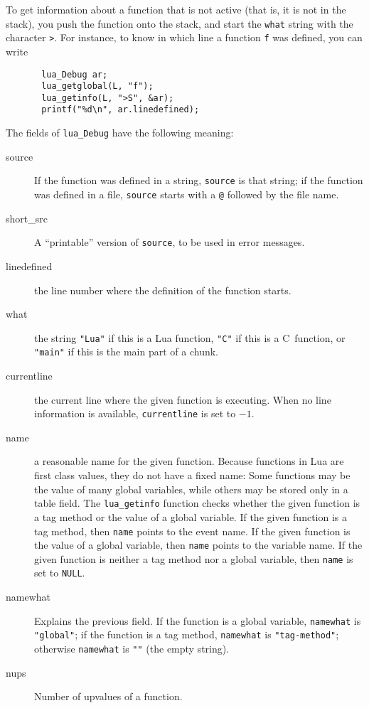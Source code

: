 \documentclass[11pt]{article}
\newcommand{\Math}[1]{$#1$}
\begin{document}
To get information about a function that is not active (that is,
it is not in the stack),
you push the function onto the stack,
and start the \verb|what| string with the character \verb|>|.
For instance, to know in which line a function \verb|f| was defined,
you can write
\begin{verbatim}
       lua_Debug ar;
       lua_getglobal(L, "f");
       lua_getinfo(L, ">S", &ar);
       printf("%d\n", ar.linedefined);
\end{verbatim}
The fields of \verb|lua_Debug| have the following meaning:
\begin{description}

\item[source]
If the function was defined in a string,
\verb|source| is that string;
if the function was defined in a file,
\verb|source| starts with a \verb|@| followed by the file name.

\item[short\_src]
A ``printable'' version of \verb|source|, to be used in error messages.

\item[linedefined]
the line number where the definition of the function starts.

\item[what] the string \verb|"Lua"| if this is a Lua function,
\verb|"C"| if this is a C~function,
or \verb|"main"| if this is the main part of a chunk.

\item[currentline]
the current line where the given function is executing.
When no line information is available,
\verb|currentline| is set to \Math{-1}.

\item[name]
a reasonable name for the given function.
Because functions in Lua are first class values,
they do not have a fixed name:
Some functions may be the value of many global variables,
while others may be stored only in a table field.
The \verb|lua_getinfo| function checks whether the given
function is a tag method or the value of a global variable.
If the given function is a tag method,
then \verb|name| points to the event name.
If the given function is the value of a global variable,
then \verb|name| points to the variable name.
If the given function is neither a tag method nor a global variable,
then \verb|name| is set to \verb|NULL|.

\item[namewhat]
Explains the previous field.
If the function is a global variable,
\verb|namewhat| is \verb|"global"|;
if the function is a tag method,
\verb|namewhat| is \verb|"tag-method"|;
otherwise \verb|namewhat| is \verb|""| (the empty string).

\item[nups]
Number of upvalues of a function.

\end{description}
\end{document}
